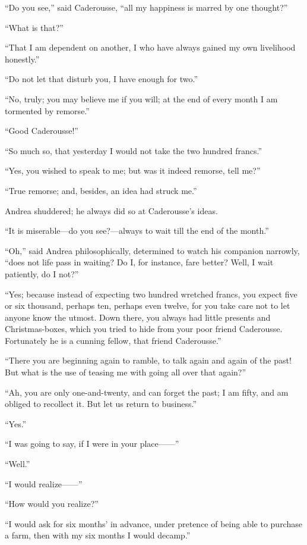 “Do you see,” said Caderousse, “all my happiness is marred by one
thought?”

“What is that?”

“That I am dependent on another, I who have always gained my own
livelihood honestly.”

“Do not let that disturb you, I have enough for two.”

“No, truly; you may believe me if you will; at the end of every month I
am tormented by remorse.”

“Good Caderousse!”

“So much so, that yesterday I would not take the two hundred francs.”

“Yes, you wished to speak to me; but was it indeed remorse, tell me?”

“True remorse; and, besides, an idea had struck me.”

Andrea shuddered; he always did so at Caderousse’s ideas.

“It is miserable—do you see?—always to wait till the end of the month.”

“Oh,” said Andrea philosophically, determined to watch his companion
narrowly, “does not life pass in waiting? Do I, for instance, fare
better? Well, I wait patiently, do I not?”

“Yes; because instead of expecting two hundred wretched francs, you
expect five or six thousand, perhaps ten, perhaps even twelve, for you
take care not to let anyone know the utmost. Down there, you always had
little presents and Christmas-boxes, which you tried to hide from your
poor friend Caderousse. Fortunately he is a cunning fellow, that friend
Caderousse.”

“There you are beginning again to ramble, to talk again and again of
the past! But what is the use of teasing me with going all over that
again?”

“Ah, you are only one-and-twenty, and can forget the past; I am fifty,
and am obliged to recollect it. But let us return to business.”

“Yes.”

“I was going to say, if I were in your place——”

“Well.”

“I would realize——”

“How would you realize?”

“I would ask for six months’ in advance, under pretence of being able
to purchase a farm, then with my six months I would decamp.”

